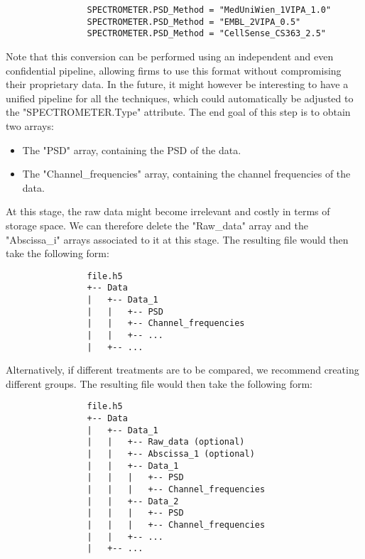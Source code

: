 \documentclass{article}
\begin{document}
            \begin{verbatim}
                SPECTROMETER.PSD_Method = "MedUniWien_1VIPA_1.0"
                SPECTROMETER.PSD_Method = "EMBL_2VIPA_0.5"
                SPECTROMETER.PSD_Method = "CellSense_CS363_2.5"
            \end{verbatim}

            Note that this conversion can be performed using an independent and even confidential pipeline, allowing firms to use this format without compromising their proprietary data. In the future, it might however be interesting to have a unified pipeline for all the techniques, which could automatically be adjusted to the "SPECTROMETER.Type" attribute. The end goal of this step is to obtain two arrays: 
            \begin{itemize}
                \item The "PSD" array, containing the PSD of the data.
                \item The "Channel\_frequencies" array, containing the channel frequencies of the data.
            \end{itemize}

            At this stage, the raw data might become irrelevant and costly in terms of storage space. We can therefore delete the "Raw\_data" array and the "Abscissa\_i" arrays associated to it at this stage. The resulting file would then take the following form:

            \begin{verbatim}
                file.h5
                +-- Data
                |   +-- Data_1
                |   |   +-- PSD
                |   |   +-- Channel_frequencies
                |   |   +-- ...
                |   +-- ...
            \end{verbatim}

            Alternatively, if different treatments are to be compared, we recommend creating different groups. The resulting file would then take the following form:

            \begin{verbatim}
                file.h5
                +-- Data
                |   +-- Data_1
                |   |   +-- Raw_data (optional)
                |   |   +-- Abscissa_1 (optional)
                |   |   +-- Data_1
                |   |   |   +-- PSD
                |   |   |   +-- Channel_frequencies
                |   |   +-- Data_2
                |   |   |   +-- PSD
                |   |   |   +-- Channel_frequencies
                |   |   +-- ...
                |   +-- ...
            \end{verbatim}
\end{document}
